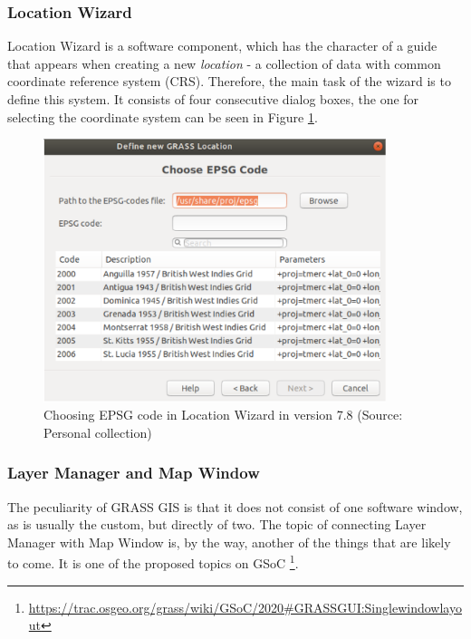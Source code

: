 \documentclass[a4paper,10pt,twoside]{article}
\begin{document}
\subsubsection{Location Wizard}
\label{subsection:wizard}
\noindent
\large
Location Wizard is a software component, which has the character of a guide that appears when creating a new \textit{location} - a collection of data with common coordinate reference system (CRS). Therefore, the main task of the wizard is to define this system. It consists of four consecutive dialog boxes, the one for selecting the coordinate system can be seen in Figure \ref{fig:loc_wizard_sour_pred}.

\vspace{0.3cm}
\begin{figure}[hbt!]
\begin{center}
\includegraphics[width=10cm]{../pictures/loc_wizard_sour_pred.png} 
\caption[Choosing EPSG code in Location Wizard in version 7.8]{Choosing EPSG code in Location Wizard in version 7.8 (Source: Personal collection)}
\label{fig:loc_wizard_sour_pred}
\end{center}
\end{figure}

\newpage
\vspace*{-1cm}
\subsubsection{Layer Manager and Map Window}

\noindent The peculiarity of GRASS GIS is that it does not consist of one software window, as is usually the custom, but directly of two. The topic of connecting Layer Manager with Map Window is, by the way, another of the things that are likely to come. It is one of the proposed topics on GSoC \footnote{\url{https://trac.osgeo.org/grass/wiki/GSoC/2020\#GRASSGUI:Singlewindowlayout}}.
\end{document}
